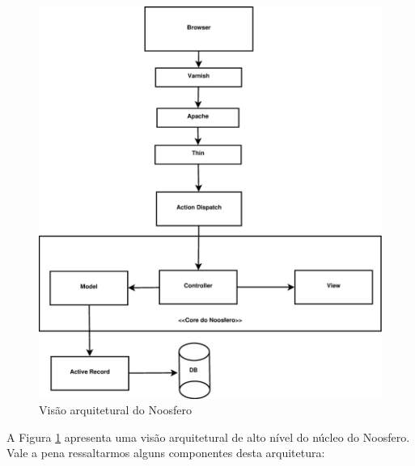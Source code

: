 \begin{figure}[h]
    \centering
    \includegraphics[keepaspectratio=true,scale=0.25]
      {figuras/noosfero_architeture.eps}
    \caption{Visão arquitetural do Noosfero}
    \label{noosfero-arch}
\end{figure}

A Figura \ref{noosfero-arch} apresenta uma visão arquitetural de alto nível
do núcleo do Noosfero. Vale a pena ressaltarmos alguns componentes desta arquitetura:

